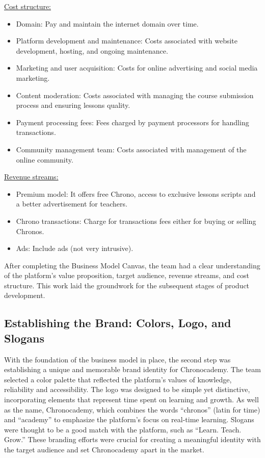 \underline{Cost structure:}
\begin{itemize}
    \item Domain: Pay and maintain the internet domain over time.
    \item Platform development and maintenance: Costs associated with website development, hosting, and ongoing maintenance.
    \item Marketing and user acquisition: Costs for online advertising and social media marketing.
    \item Content moderation: Costs associated with managing the course submission process and ensuring lessons quality.
    \item Payment processing fees: Fees charged by payment processors for handling transactions.
    \item Community management team: Costs associated with management of the online community.
\end{itemize}

\underline{Revenue streams:}
\begin{itemize}
    \item Premium model: It offers free Chrono, access to exclusive lessons scripts and a better advertisement for teachers.
    \item Chrono transactions: Charge for transactions fees either for buying or selling Chronos.
    \item Ads: Include ads (not very intrusive).
\end{itemize}

After completing the Business Model Canvas, the team had a clear understanding of the platform's value proposition, target audience, revenue streams, and cost structure.
This work laid the groundwork for the subsequent stages of product development.

\subsection{Establishing the Brand: Colors, Logo, and Slogans}\label{subsec:colors-logo-slogans}
With the foundation of the business model in place, the second step was establishing a unique and memorable brand identity for Chronocademy.
The team selected a color palette that reflected the platform’s values of knowledge, reliability and accessibility.
The logo was designed to be simple yet distinctive, incorporating elements that represent time spent on learning and growth.
As well as the name, Chronocademy, which combines the words ``chronos'' (latin for time) and ``academy'' to emphasize the platform's focus on real-time learning.
Slogans were thought to be a good match with the platform, such as ``Learn.
Teach.
Grow.'' These branding efforts were crucial for creating a meaningful identity with the target audience and set Chronocademy apart in the market.

